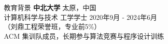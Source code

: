 \documentclass{resume} %
\begin{document}
\linespread{0.98}


\begin{rSection}{教育背景}
\textbf{中北大学} \hfill 太原，中国\\
计算机科学与技术 工学学士 \hfill 2020年9月 - 2024年6月\\
（刘鼎工程荣誉班，专业前5\%）\\
ACM 集训队成员，长期参与算法竞赛与程序设计训练
\end{rSection}

\end{document}
